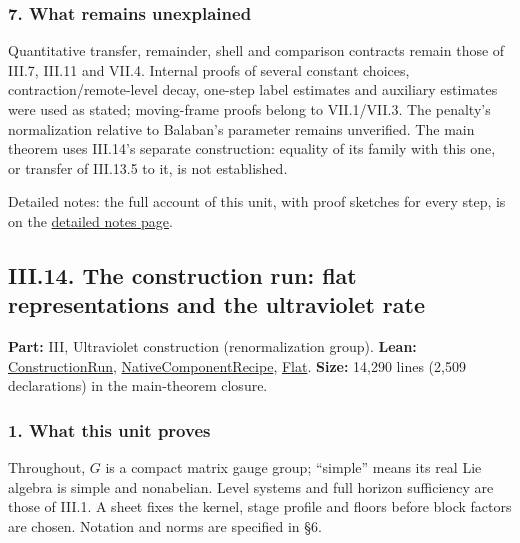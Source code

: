 \documentclass[
  letterpaper,
  11pt]{article}
\begin{document}
\subsubsection{7. What remains
unexplained}\label{what-remains-unexplained-15}

Quantitative transfer, remainder, shell and comparison contracts remain
those of III.7, III.11 and VII.4. Internal proofs of several constant
choices, contraction/remote-level decay, one-step label estimates and
auxiliary estimates were used as stated; moving-frame proofs belong to
VII.1/VII.3. The penalty's normalization relative to Balaban's parameter
remains unverified. The main theorem uses III.14's separate
construction: equality of its family with this one, or transfer of
III.13.5 to it, is not established.

Detailed notes: the full account of this unit, with proof sketches for
every step, is on the
\href{https://github.com/scottnarmstrong/yang-mills-informalization/blob/main/outline/notes/III-13.md}{detailed
notes page}.

\subsection{III.14. The construction run: flat representations and the
ultraviolet
rate}\label{iii.14.-the-construction-run-flat-representations-and-the-ultraviolet-rate}

\textbf{Part:} III, Ultraviolet construction (renormalization group).
\textbf{Lean:}
\href{https://github.com/yang-mills-group/OpenAI-YM-20261028/blob/3456e5e75cf8d4cd558955a5c7638fba2d68f464/YM/Independent/ConstructionRun.lean}{ConstructionRun},
\href{https://github.com/yang-mills-group/OpenAI-YM-20261028/blob/3456e5e75cf8d4cd558955a5c7638fba2d68f464/YM/Integration/NativeComponentRecipe.lean}{NativeComponentRecipe},
\href{https://github.com/yang-mills-group/OpenAI-YM-20261028/tree/3456e5e75cf8d4cd558955a5c7638fba2d68f464/YM/RG08/Flat}{Flat}.
\textbf{Size:} 14,290 lines (2,509 declarations) in the main-theorem
closure.

\subsubsection{1. What this unit proves}\label{what-this-unit-proves-16}

Throughout, \(G\) is a compact matrix gauge group; ``simple'' means its
real Lie algebra is simple and nonabelian. Level systems and full
horizon sufficiency are those of III.1. A sheet fixes the kernel, stage
profile and floors before block factors are chosen. Notation and norms
are specified in §6.
\end{document}
